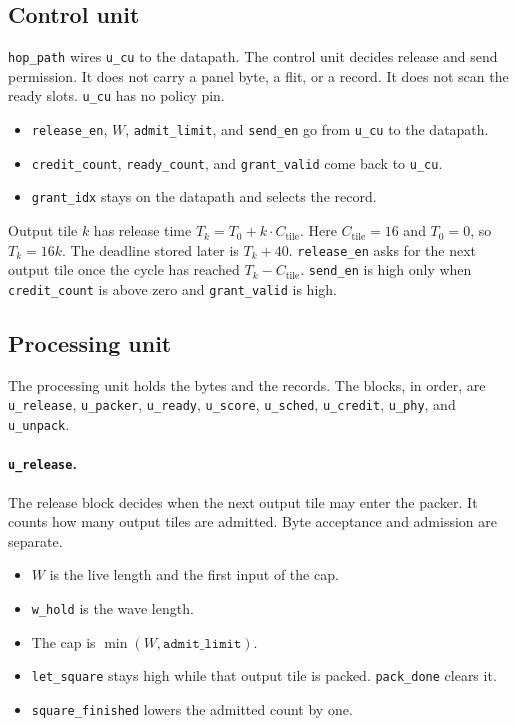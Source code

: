 \documentclass[11pt,a4paper]{article}
\begin{document}
\subsection{Control unit}
\texttt{hop\_path} wires \texttt{u\_cu} to the datapath.
The control unit decides release and send permission.
It does not carry a panel byte, a flit, or a record.
It does not scan the ready slots.
\texttt{u\_cu} has no policy pin.
\begin{itemize}[leftmargin=*]
  \item \texttt{release\_en}, $W$, \texttt{admit\_limit}, and \texttt{send\_en} go from \texttt{u\_cu} to the datapath.
  \item \texttt{credit\_count}, \texttt{ready\_count}, and \texttt{grant\_valid} come back to \texttt{u\_cu}.
  \item \texttt{grant\_idx} stays on the datapath and selects the record.
\end{itemize}

Output tile $k$ has release time $T_k = T_0 + k \cdot C_{\mathrm{tile}}$.
Here $C_{\mathrm{tile}} = 16$ and $T_0 = 0$, so $T_k = 16k$.
The deadline stored later is $T_k + 40$.
\texttt{release\_en} asks for the next output tile once the cycle has reached $T_k - C_{\mathrm{tile}}$.
\texttt{send\_en} is high only when \texttt{credit\_count} is above zero and \texttt{grant\_valid} is high.
\figcu

\subsection{Processing unit}
The processing unit holds the bytes and the records.
The blocks, in order, are \texttt{u\_release}, \texttt{u\_packer}, \texttt{u\_ready}, \texttt{u\_score}, \texttt{u\_sched}, \texttt{u\_credit}, \texttt{u\_phy}, and \texttt{u\_unpack}.
\figpu

\paragraph{\texttt{u\_release}.}
The release block decides when the next output tile may enter the packer.
It counts how many output tiles are admitted.
Byte acceptance and admission are separate.
\begin{itemize}[leftmargin=*]
  \item $W$ is the live length and the first input of the cap.
  \item \texttt{w\_hold} is the wave length.
  \item The cap is $\min(W, \texttt{admit\_limit})$.
  \item \texttt{let\_square} stays high while that output tile is packed. \texttt{pack\_done} clears it.
  \item \texttt{square\_finished} lowers the admitted count by one.
\end{itemize}
\figrelease
\end{document}
